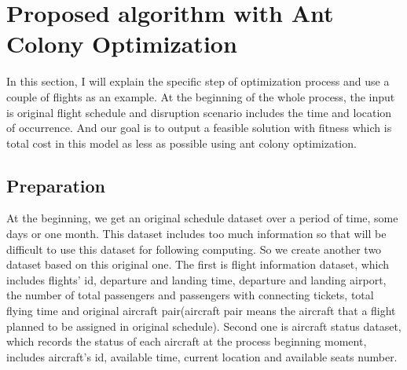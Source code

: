 \documentclass[senior]{IPSstyle}
\begin{document}


\chapter{Proposed algorithm with Ant Colony Optimization} \label{implement}
In this section, I will explain the specific step of optimization process and use a couple of flights as an example. At the beginning of the whole process, the input is original flight schedule and disruption scenario includes the time and location of occurrence. And our goal is to output a feasible solution with fitness which is total cost in this model as less as possible using ant colony optimization.

\section{Preparation}

At the beginning, we get an original schedule dataset over a period of time, some days or one month. This dataset includes too much information so that will be difficult to use this dataset for following computing. So we create another two dataset based on this original one. The first is flight information dataset, which includes flights’ id, departure and landing time, departure and landing airport, the number of total passengers and passengers with connecting tickets, total flying time and original aircraft pair(aircraft pair means the aircraft that a flight planned to be assigned in original schedule). Second one is aircraft status dataset, which records the status of each aircraft at the process beginning moment, includes aircraft's id, available time, current location and available seats number.
\end{document}
